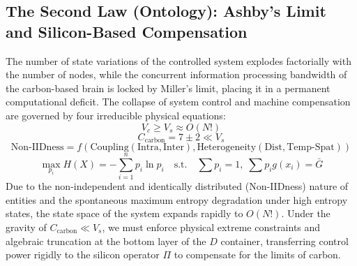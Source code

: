 \documentclass[11pt,a4paper]{article}
\begin{document}
\subsection*{The Second Law (Ontology): Ashby's Limit and Silicon-Based Compensation}
The number of state variations of the controlled system explodes factorially with the number of nodes, while the concurrent information processing bandwidth of the carbon-based brain is locked by Miller's limit, placing it in a permanent computational deficit. The collapse of system control and machine compensation are governed by four irreducible physical equations:
\begin{equation}
    V_c \ge V_s \approx O(N!)
\end{equation}
\begin{equation}
    C_{\text{carbon}} = 7 \pm 2 \ll V_s
\end{equation}
\begin{equation}
    \text{Non-IIDness} = f\left(\text{Coupling}(\text{Intra}, \text{Inter}), \text{Heterogeneity}(\text{Dist}, \text{Temp-Spat})\right)
\end{equation}
\begin{equation}
    \max_{p_i} H(X) = -\sum_{i=1}^{n} p_i \ln p_i \quad \text{s.t.} \quad \sum p_i = 1, \; \sum p_i g(x_i) = \bar{G}
\end{equation}
Due to the non-independent and identically distributed (Non-IIDness) nature of entities and the spontaneous maximum entropy degradation under high entropy states, the state space of the system expands rapidly to $O(N!)$. Under the gravity of $C_{\text{carbon}} \ll V_s$, we must enforce physical extreme constraints and algebraic truncation at the bottom layer of the $D$ container, transferring control power rigidly to the silicon operator $\Pi$ to compensate for the limits of carbon.
\end{document}
